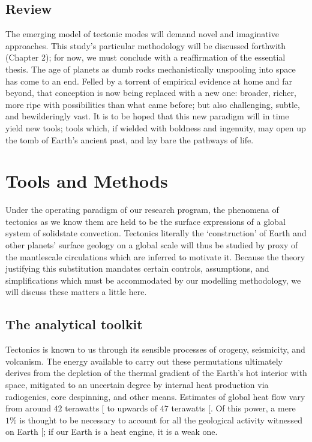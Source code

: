 \documentclass[letterpaper,10pt,english]{jupyterBook}
\begin{document}
\section{Review}
\label{\detokenize{content/chapter_01_background/main:review}}
\sphinxAtStartPar
The emerging model of tectonic modes will demand novel and imaginative approaches. This study’s particular methodology will be discussed forthwith (Chapter 2); for now, we must conclude with a reaffirmation of the essential thesis. The age of planets as dumb rocks mechanistically unspooling into space has come to an end. Felled by a torrent of empirical evidence at home and far beyond, that conception is now being replaced with a new one: broader, richer, more ripe with possibilities than what came before; but also challenging, subtle, and bewilderingly vast. It is to be hoped that this new paradigm will in time yield new tools; tools which, if wielded with boldness and ingenuity, may open up the tomb of Earth’s ancient past, and lay bare the pathways of life.


\chapter{Tools and Methods}
\label{\detokenize{content/chapter_02_methods/intro:tools-and-methods}}\label{\detokenize{content/chapter_02_methods/intro::doc}}
\sphinxAtStartPar
Under the operating paradigm of our research program, the phenomena of tectonics as we know them are held to be the surface expressions of a global system of solid\sphinxhyphen{}state convection. Tectonics \sphinxhyphen{} literally the ‘construction’ of Earth and other planets’ surface geology on a global scale \sphinxhyphen{} will thus be studied by proxy of the mantle\sphinxhyphen{}scale circulations which are inferred to motivate it. Because the theory justifying this substitution mandates certain controls, assumptions, and simplifications which must be accommodated by our modelling methodology, we will discuss these matters a little here.


\section{The analytical toolkit}
\label{\detokenize{content/chapter_02_methods/section1:the-analytical-toolkit}}\label{\detokenize{content/chapter_02_methods/section1::doc}}
\sphinxAtStartPar
Tectonics is known to us through its sensible processes of orogeny, seismicity, and volcanism. The energy available to carry out these permutations ultimately derives from the depletion of the thermal gradient of the Earth’s hot interior with space, mitigated to an uncertain degree by internal heat production via radiogenics, core despinning, and other means. Estimates of global heat flow vary from around \(42\) terawatts {[}\sphinxcite{references:id85}{]} to upwards of \(47\) terawatts {[}\sphinxcite{references:id108}{]}. Of this power, a mere \(1\%\) is thought to be necessary to account for all the geological activity witnessed on Earth {[}\sphinxcite{references:id88}{]}; if our Earth is a heat engine, it is a weak one.
\end{document}
